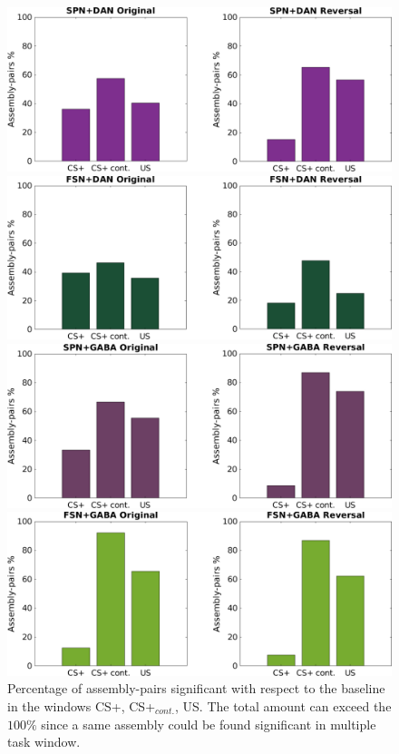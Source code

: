 \begin{figure}[H]
    \centering
    \includegraphics[scale=0.3]{figures/SPN_DANHisto.pdf}
    
    \vspace{1cm}
    
    \includegraphics[scale=0.3]{figures/FSN_DANHisto.pdf}
    
    \vspace{1cm}
    
    \includegraphics[scale=0.3]{figures/SPN_GABAHisto.pdf}
    
    \vspace{1cm}
    
    \includegraphics[scale=0.3]{figures/FSN_GABAHisto.pdf}
\caption{Percentage of assembly-pairs significant with respect to the baseline in the windows CS+, CS+$_{cont.}$, US. The total amount can exceed the $100\%$ since a same assembly could be found significant in multiple task window.}
    \label{fig:FriedHistoDAN}
\end{figure}
